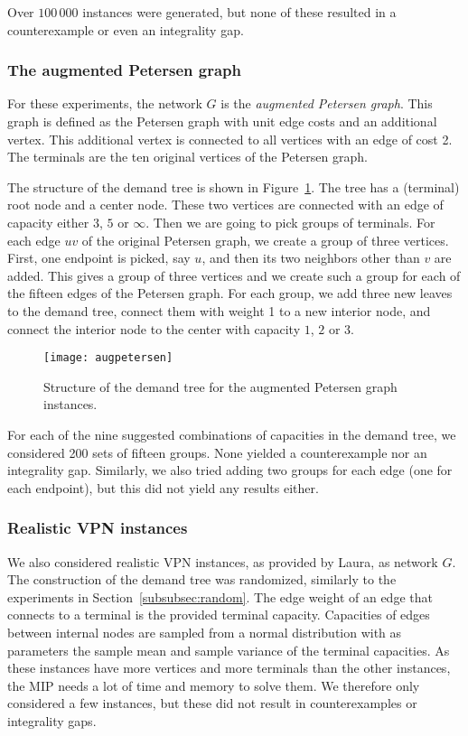 Over $100\,000$ instances were generated, but none of these resulted in a counterexample or even an integrality gap.

\subsubsection{The augmented Petersen graph}
For these experiments, the network $G$ is the \emph{augmented Petersen graph}.
This graph is defined as the Petersen graph with unit edge costs and an additional vertex.
This additional vertex is connected to all vertices with an edge of cost 2.
The terminals are the ten original vertices of the Petersen graph.

The structure of the demand tree is shown in Figure~\ref{fig:augpetersen}.
The tree has a (terminal) root node and a center node.
These two vertices are connected with an edge of capacity either $3$, $5$ or $\infty$.
Then we are going to pick groups of terminals.
For each edge $uv$ of the original Petersen graph, we create a group of three vertices.
First, one endpoint is picked, say $u$, and then its two neighbors other than $v$ are added.
This gives a group of three vertices and we create such a group for each of the fifteen edges of the Petersen graph.
For each group, we add three new leaves to the demand tree, connect them with weight 1 to a new interior node, and connect the interior node to the center with capacity $1$, $2$ or $3$.

\begin{figure}
    \centering
    \texttt{[image: augpetersen]}
    \caption{Structure of the demand tree for the augmented Petersen graph instances.}
    \label{fig:augpetersen}
\end{figure}

For each of the nine suggested combinations of capacities in the demand tree, we considered 200 sets of fifteen groups.
None yielded a counterexample nor an integrality gap.
Similarly, we also tried adding two groups for each edge (one for each endpoint), but this did not yield any results either.

\subsubsection{Realistic VPN instances}
We also considered realistic VPN instances, as provided by Laura, as network $G$.
The construction of the demand tree was randomized, similarly to the experiments in Section~\ref{subsubsec:random}.
The edge weight of an edge that connects to a terminal is the provided terminal capacity.
Capacities of edges between internal nodes are sampled from a normal distribution with as parameters the sample mean and sample variance of the terminal capacities.
As these instances have more vertices and more terminals than the other instances, the MIP needs a lot of time and memory to solve them.
We therefore only considered a few instances, but these did not result in counterexamples or integrality gaps.

